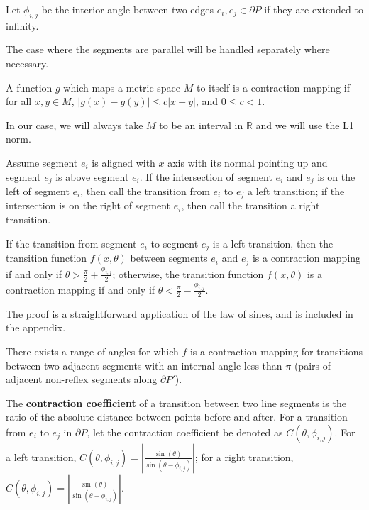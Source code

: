 \documentclass[]{styles/svproc}  %
\begin{document}
\begin{definition}
Let $\phi_{i,j}$ be the interior angle between two edges $e_i, e_j \in \partial P$ if
they are extended to infinity. 
\end{definition}

The case where the segments are parallel will be
handled separately where necessary. 

\begin{definition}

A function $g$ which maps a metric space $M$ to itself is a contraction mapping if for all
$x, y \in M$, $\lvert g(x) - g(y) \rvert \leq c \lvert x-y \rvert$, and $0 \leq c < 1$.
\end{definition}

In our case, we will always take $M$ to be an interval in $\mathbb{R}$ and we
will use the L1 norm.

\begin{definition}
Assume segment $e_i$ is aligned with $x$ axis with its normal pointing up and
segment $e_j$ is above segment $e_i$. If the intersection of segment $e_i$ and
$e_j$ is
on the left of segment $e_i$, then call the transition from $e_i$ to $e_j$ a left
transition; if the intersection is on the right of segment $e_i$, then call the
transition a right transition.
\end{definition}

\begin{lemma} \label{lemma:angrange}
If the transition from segment $e_i$ to segment $e_j$ is a left transition, then the
transition function $f(x, \theta)$ between segments $e_i$ and $e_j$ is a contraction
mapping if and only if $\theta > \frac{\pi}{2}+\frac{\phi_{i, j}}{2}$;
otherwise, the transition function $f(x, \theta)$ is a contraction mapping if
and only if $\theta < \frac{\pi}{2}-\frac{\phi_{i, j}}{2}$.
\end{lemma}

The proof is a straightforward application of the law of sines, and is included
in the appendix.

\begin{corollary} \label{coro:existcontract}
There exists a range of angles for which $f$ is a contraction mapping for transitions between two adjacent 
segments with an internal angle less than $\pi$ (pairs of adjacent non-reflex
segments along $\partial P'$).
\end{corollary}

\begin{definition}
The \textbf{contraction coefficient} of a transition between two
line segments is the ratio of the absolute distance between points before and after.
For a transition from $e_i$ to $e_j$ in $\partial P$, let the contraction
coefficient be denoted as $C(\theta, \phi_{i, j})$. 
For a left transition, $C(\theta, \phi_{i, j}) = | \frac{\sin(\theta)}{\sin(\theta - \phi_{i, j})} |$; 
for a right transition,  $C(\theta, \phi_{i, j}) = | \frac{\sin(\theta)}{\sin(\theta + \phi_{i, j})} |$.
\end{definition}
\end{document}
